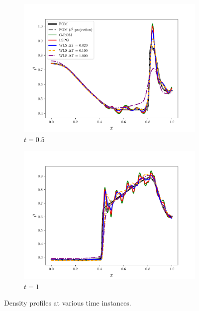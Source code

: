 \begin{figure}
\begin{center}
\begin{subfigure}[t]{0.45\textwidth}
\includegraphics[width=1.\linewidth]{figs/sod/rho_t05_compare.pdf}
\caption{$t=0.5$}
\end{subfigure}
\begin{subfigure}[t]{0.45\textwidth}
\includegraphics[width=1.\linewidth]{figs/sod/rho_t1_compare.pdf}
\caption{$t=1$}
\end{subfigure}
\caption{Density profiles at various time instances.}
\label{fig:sod_density}
\end{center}
\end{figure}


